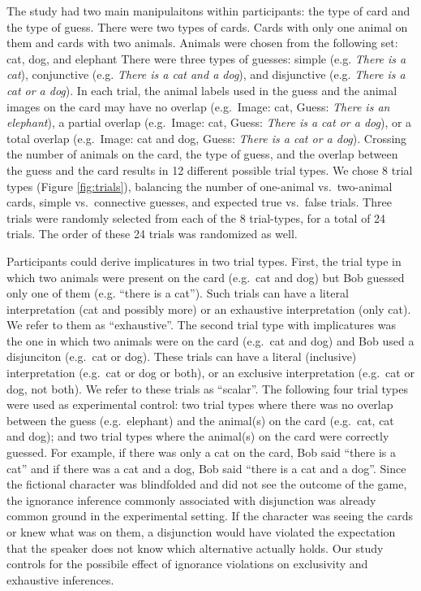\documentclass[floatsintext,man]{apa6}
\theoremstyle{definition}
\theoremstyle{definition}
\theoremstyle{definition}
\theoremstyle{remark}
\begin{document}
The study had two main manipulaitons within participants: the type of
card and the type of guess. There were two types of cards. Cards with
only one animal on them and cards with two animals. Animals were chosen
from the following set: cat, dog, and elephant There were three types of
guesses: simple (e.g. \emph{There is a cat}), conjunctive (e.g.
\emph{There is a cat and a dog}), and disjunctive (e.g. \emph{There is a
cat or a dog}). In each trial, the animal labels used in the guess and
the animal images on the card may have no overlap (e.g.~Image: cat,
Guess: \emph{There is an elephant}), a partial overlap (e.g.~Image: cat,
Guess: \emph{There is a cat or a dog}), or a total overlap (e.g.~Image:
cat and dog, Guess: \emph{There is a cat or a dog}). Crossing the number
of animals on the card, the type of guess, and the overlap between the
guess and the card results in 12 different possible trial types. We
chose 8 trial types (Figure \ref{fig:trials}), balancing the number of
one-animal vs.~two-animal cards, simple vs.~connective guesses, and
expected true vs.~false trials. Three trials were randomly selected from
each of the 8 trial-types, for a total of 24 trials. The order of these
24 trials was randomized as well.

Participants could derive implicatures in two trial types. First, the
trial type in which two animals were present on the card (e.g.~cat and
dog) but Bob guessed only one of them (e.g. \enquote{there is a cat}).
Such trials can have a literal interpretation (cat and possibly more) or
an exhaustive interpretation (only cat). We refer to them as
\enquote{exhaustive}. The second trial type with implicatures was the
one in which two animals were on the card (e.g.~cat and dog) and Bob
used a disjunciton (e.g.~cat or dog). These trials can have a literal
(inclusive) interpretation (e.g.~cat or dog or both), or an exclusive
interpretation (e.g.~cat or dog, not both). We refer to these trials as
\enquote{scalar}. The following four trial types were used as
experimental control: two trial types where there was no overlap between
the guess (e.g.~elephant) and the animal(s) on the card (e.g.~cat, cat
and dog); and two trial types where the animal(s) on the card were
correctly guessed. For example, if there was only a cat on the card, Bob
said \enquote{there is a cat} and if there was a cat and a dog, Bob said
\enquote{there is a cat and a dog}. Since the fictional character was
blindfolded and did not see the outcome of the game, the ignorance
inference commonly associated with disjunction was already common ground
in the experimental setting. If the character was seeing the cards or
knew what was on them, a disjunction would have violated the expectation
that the speaker does not know which alternative actually holds. Our
study controls for the possibile effect of ignorance violations on
exclusivity and exhaustive inferences.
\end{document}
